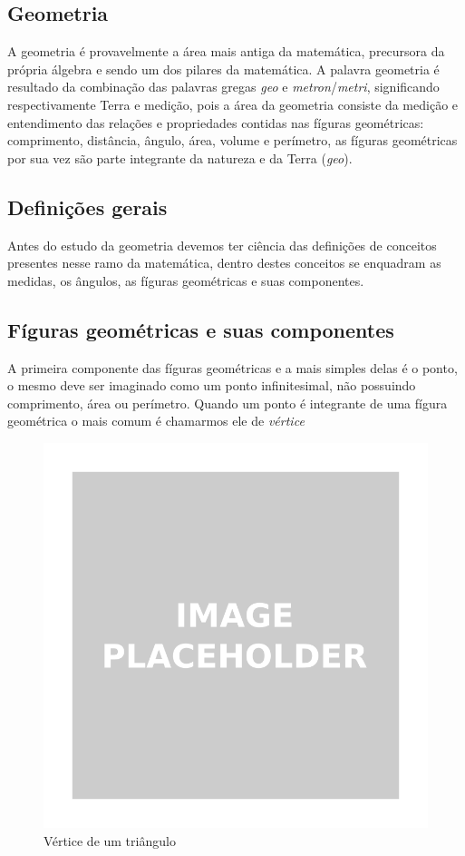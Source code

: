 \renewcommand{\sectionauthor}{Prof. Gustavo Ale}

\begin{multicols*}{2}
        
    \section*{Geometria}
    A geometria é provavelmente a área mais antiga da matemática, precursora da própria álgebra e sendo um dos pilares 
    da matemática. A palavra geometria é resultado da combinação das palavras gregas \textit{geo} e 
    \textit{metron}/\textit{metri}, significando respectivamente Terra e medição, pois a área da geometria consiste da
    medição e entendimento das relações e propriedades  contidas nas fíguras geométricas: comprimento, distância, ângulo, 
    área, volume e perímetro, as fíguras geométricas por sua vez são parte integrante da natureza e da Terra (\textit{geo}).
    
    \subsection*{Definições gerais}
    Antes do estudo da geometria devemos ter ciência das definições de conceitos presentes nesse ramo da matemática, 
    dentro destes conceitos se enquadram as medidas, os ângulos, as fíguras geométricas e suas componentes.  
    
    \subsection*{Fíguras geométricas e suas componentes}
    A primeira componente das fíguras geométricas e a mais simples delas é o ponto, o mesmo deve ser imaginado como um 
    ponto infinitesimal, não possuindo comprimento, área ou perímetro. Quando um ponto é integrante de uma fígura 
    geométrica o mais comum é chamarmos ele de \textit{vértice}

    \begin{figure}[H]
        \centering
        \includegraphics[width=0.7\columnwidth]{assets/image_placeholder.png}
        \caption{Vértice de um triângulo }
    \end{figure}


\end{multicols*}
